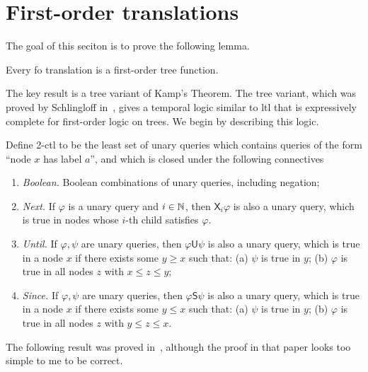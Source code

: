 \section{First-order translations}\label{sec:fo-translation}

The goal of this seciton is to prove the following lemma.
\begin{lemma}\label{lem:fo-translation} Every fo translation is a first-order tree function.
\end{lemma}

 The key result is a tree variant of Kamp's Theorem. The tree variant, which was proved by Schlingloff in~\cite{schlingloff1992expressive}, gives a temporal logic similar to {\sc ltl} that is expressively complete for first-order logic on trees. We begin by describing this logic.


\newcommand{\nextmod}{\mathsf X}
\newcommand{\untilmod}{\mathsf U}
\newcommand{\sincemod}{\mathsf S}


\begin{definition}[2-ctl]
    Define 2-ctl to be the least set of unary queries which contains queries of the form ``node $x$ has label $a$'', and which is closed under the following connectives
    \begin{enumerate}
        \item \emph{Boolean.} Boolean combinations of unary queries, including negation;
        \item \emph{Next.} If $\varphi$ is a unary query and $i \in {\mathbb N}$, then  $\nextmod_i \varphi$ is also a unary query, which is true in nodes whose $i$-th child satisfies $\varphi$.
         \item \emph{Until.} If $\varphi,\psi$ are  unary queries, then  $\varphi \untilmod \psi$ is also a unary query, which is true in a node $x$ if there exists some $y \geq x$ such that: (a) $\psi$ is true in $y$; (b) $\varphi$ is true in all nodes $z$ with $x \leq z \leq y$;
         \item \emph{Since.} If $\varphi,\psi$ are  unary queries, then  $\varphi \sincemod \psi$ is also a unary query, which is true in a node $x$ if there exists some $y \leq x$ such that: (a) $\psi$ is true in $y$; (b) $\varphi$ is true in all nodes $z$ with $y \leq z \leq x$.
    \end{enumerate}
\end{definition}

The following result was proved in~\cite[Theorem 2.6]{schlingloff1992expressive}, although the proof in that paper looks too simple to me to be correct.

